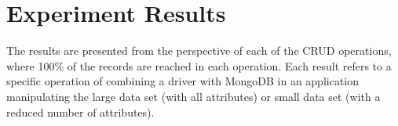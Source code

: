 \documentclass{svproc}
\begin{document}
\section{Experiment Results}
\label{section:resultados}

The results are presented from the perspective of each of the CRUD operations, where 100\% of the records are reached in each operation.
Each result refers to a specific operation of combining a driver with MongoDB in an application manipulating the large data set (with all attributes) or small data set (with a reduced number of attributes).

\end{document}
